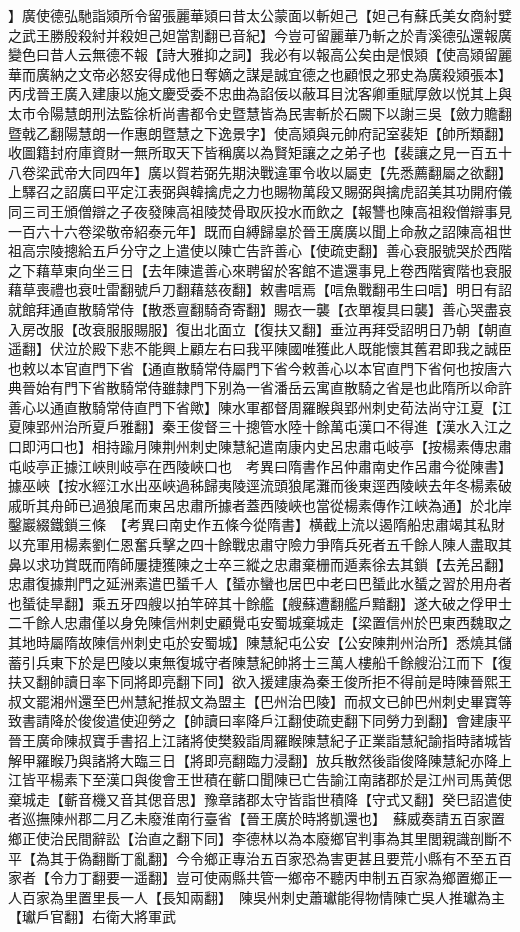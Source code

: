 】廣使德弘馳詣熲所令留張麗華熲曰昔太公蒙面以斬妲己【妲己有蘇氏美女商紂嬖之武王勝殷殺紂并殺妲己妲當割翻已音紀】今豈可留麗華乃斬之於青溪德弘還報廣變色曰昔人云無德不報【詩大雅抑之詞】我必有以報高公矣由是恨熲【使高熲留麗華而廣納之文帝必怒安得成他日奪嫡之謀是誠宜德之也顧恨之邪史為廣殺熲張本】丙戌晉王廣入建康以施文慶受委不忠曲為諂佞以蔽耳目沈客卿重賦厚斂以悦其上與太市令陽慧朗刑法監徐析尚書都令史暨慧皆為民害斬於石闕下以謝三吳【斂力贍翻暨戟乙翻陽慧朗一作惠朗暨慧之下逸景字】使高熲與元帥府記室裴矩【帥所類翻】收圖籍封府庫資財一無所取天下皆稱廣以為賢矩讓之之弟子也【裴讓之見一百五十八卷梁武帝大同四年】廣以賀若弼先期決戰違軍令收以屬吏【先悉薦翻屬之欲翻】上驛召之詔廣曰平定江表弼與韓擒虎之力也賜物萬段又賜弼與擒虎詔美其功開府儀同三司王頒僧辯之子夜發陳高祖陵焚骨取灰投水而飲之【報讐也陳高祖殺僧辯事見一百六十六卷梁敬帝紹泰元年】既而自縛歸辠於晉王廣廣以聞上命赦之詔陳高祖世祖高宗陵摠給五戶分守之上遣使以陳亡告許善心【使疏吏翻】善心衰服號哭於西階之下藉草東向坐三日【去年陳遣善心來聘留於客館不遣還事見上卷西階賓階也衰服藉草喪禮也衰吐雷翻號戶刀翻藉慈夜翻】敕書唁焉【唁魚戰翻弔生曰唁】明日有詔就館拜通直散騎常侍【散悉亶翻騎奇寄翻】賜衣一襲【衣單複具曰襲】善心哭盡哀入房改服【改衰服服賜服】復出北面立【復扶又翻】垂泣再拜受詔明日乃朝【朝直遥翻】伏泣於殿下悲不能興上顧左右曰我平陳國唯獲此人既能懷其舊君即我之誠臣也敕以本官直門下省【通直散騎常侍屬門下省今敕善心以本官直門下省何也按唐六典晉始有門下省散騎常侍雖隸門下别為一省潘岳云寓直散騎之省是也此隋所以命許善心以通直散騎常侍直門下省歟】陳水軍都督周羅睺與郢州刺史荀法尚守江夏【江夏陳郢州治所夏戶雅翻】秦王俊督三十摠管水陸十餘萬屯漢口不得進【漢水入江之口即沔口也】相持踰月陳荆州刺史陳慧紀遣南康内史呂忠肅屯岐亭【按楊素傳忠肅屯岐亭正據江峽則岐亭在西陵峽口也　考異曰隋書作呂仲肅南史作呂肅今從陳書】據巫峽【按水經江水出巫峽過秭歸夷陵逕流頭狼尾灘而後東逕西陵峽去年冬楊素破戚昕其舟師已過狼尾而東呂忠肅所據者蓋西陵峽也當從楊素傳作江峽為通】於北岸鑿巖綴鐵鎖三條　【考異曰南史作五條今從隋書】横截上流以遏隋船忠肅竭其私財以充軍用楊素劉仁恩奮兵擊之四十餘戰忠肅守險力爭隋兵死者五千餘人陳人盡取其鼻以求功賞既而隋師屢捷獲陳之士卒三縱之忠肅棄栅而遁素徐去其鎖【去羌呂翻】忠肅復據荆門之延洲素遣巴蜑千人【蜑亦蠻也居巴中老曰巴蜑此水蜑之習於用舟者也蜑徒旱翻】乘五牙四艘以拍竿碎其十餘艦【艘蘇遭翻艦戶黯翻】遂大破之俘甲士二千餘人忠肅僅以身免陳信州刺史顧覺屯安蜀城棄城走【梁置信州於巴東西魏取之其地時屬隋故陳信州刺史屯於安蜀城】陳慧紀屯公安【公安陳荆州治所】悉燒其儲蓄引兵東下於是巴陵以東無復城守者陳慧紀帥將士三萬人樓船千餘艘沿江而下【復扶又翻帥讀日率下同將即亮翻下同】欲入援建康為秦王俊所拒不得前是時陳晉熙王叔文罷湘州還至巴州慧紀推叔文為盟主【巴州治巴陵】而叔文已帥巴州刺史畢寶等致書請降於俊俊遣使迎勞之【帥讀曰率降戶江翻使疏吏翻下同勞力到翻】會建康平晉王廣命陳叔寶手書招上江諸將使樊毅詣周羅睺陳慧紀子正業詣慧紀諭指時諸城皆解甲羅睺乃與諸將大臨三日【將即亮翻臨力浸翻】放兵散然後詣俊降陳慧紀亦降上江皆平楊素下至漢口與俊會王世積在蘄口聞陳已亡告諭江南諸郡於是江州司馬黄偲棄城走【蘄音機又音其偲音思】豫章諸郡太守皆詣世積降【守式又翻】癸巳詔遣使者巡撫陳州郡二月乙未廢淮南行臺省【晉王廣於時將凱還也】　蘇威奏請五百家置鄉正使治民間辭訟【治直之翻下同】李德林以為本廢鄉官判事為其里閭親識剖斷不平【為其于偽翻斷丁亂翻】今令鄉正專治五百家恐為害更甚且要荒小縣有不至五百家者【令力丁翻要一遥翻】豈可使兩縣共管一鄉帝不聽丙申制五百家為鄉置鄉正一人百家為里置里長一人【長知兩翻】　陳吳州刺史蕭瓛能得物情陳亡吳人推瓛為主【瓛戶官翻】右衛大將軍武